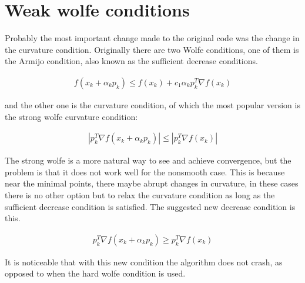 \section{Weak wolfe conditions}

Probably the most important change made to the original code was the change in the curvature condition.  Originally there are two Wolfe conditions, one of them is the Armijo condition, also known as the sufficient decrease conditions.

\begin{equation}
  \begin{aligned}
    f(x_k + \alpha_kp_k) \leq f(x_k) + c_1 \alpha _k p_k^T\nabla f(x_k)
  \end{aligned}
\end{equation}

and the other one is the curvature condition, of which the most popular version is the strong wolfe curvature condition:

\begin{equation}
  \begin{aligned}
    |p_k^T \nabla f(x_k + \alpha _k p_k)| \leq |p_k^T \nabla f(x_k)|
  \end{aligned}
\end{equation}

The strong wolfe is a more natural way to see and achieve convergence, but the problem is that it does not work well for the nonsmooth case. This is because near the minimal points, there maybe abrupt changes in curvature, in these cases there is no other option but to relax the curvature condition as long as the sufficient decrease condition is satisfied.  The suggested new decrease condition is this.

\begin{equation}
  \begin{aligned}
    p_k^T \nabla f(x_k + \alpha _k p_k) \geq p_k^T \nabla f(x_k)
  \end{aligned}
\end{equation}

It is noticeable that with this new condition the algorithm does not crash, as opposed to when the hard wolfe condition is used.
